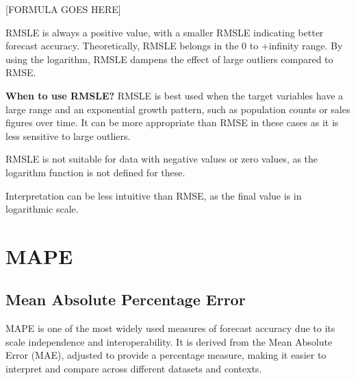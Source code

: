 \begin{center}
    [FORMULA GOES HERE]
\end{center}

RMSLE is always a positive value, with a smaller RMSLE indicating better forecast accuracy. Theoretically, RMSLE belongs in the 0 to +infinity range.
By using the logarithm, RMSLE dampens the effect of large outliers compared to RMSE.

\textbf{When to use RMSLE?}
RMSLE is best used when the target variables have a large range and an exponential growth pattern, such as population counts or sales figures over time.
It can be more appropriate than RMSE in these cases as it is less sensitive to large outliers.

{
    \item RMSLE is not suitable for data with negative values or zero values, as the logarithm function is not defined for these.
    \item Interpretation can be less intuitive than RMSE, as the final value is in logarithmic scale.
}

\clearpage
\thispagestyle{regressionstyle}
\section{MAPE}
\subsection{Mean Absolute Percentage Error}

MAPE is one of the most widely used measures of forecast accuracy due to its scale independence and interoperability.
It is derived from the Mean Absolute Error (MAE), adjusted to provide a percentage measure, making it easier to interpret and compare across different datasets and contexts.

\begin{center}
\end{center}


